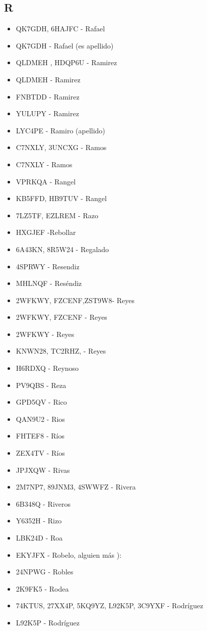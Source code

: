 \subsection*{R}
\begin{itemize}[leftmargin=*,nosep]
\item QK7GDH, 6HAJFC - Rafael
\item QK7GDH - Rafael (es apellido)
\item QLDMEH , HDQP6U - Ramirez
\item QLDMEH - Ramirez
\item FNBTDD - Ramirez
\item YULUPY - Ramirez
\item LYC4PE - Ramiro (apellido)
\item C7NXLY, 3UNCXG - Ramos
\item C7NXLY  -  Ramos
\item VPRKQA -  Rangel
\item KB5FFD, HB9TUV - Rangel
\item 7LZ5TF, EZLREM - Razo
\item HXGJEF -Rebollar
\item 6A43KN, 8R5W24 - Regalado
\item 4SPRWY - Resendiz
\item MHLNQF - Reséndiz
\item 2WFKWY, FZCENF,ZST9W8- Reyes
\item 2WFKWY, FZCENF - Reyes
\item 2WFKWY  -  Reyes
\item KNWN28, TC2RHZ, - Reyes
\item H6RDXQ - Reynoso
\item PV9QBS - Reza
\item GPD5QV - Rico
\item QAN9U2 - Rios
\item FHTEF8 - Ríos
\item ZEX4TV  -  Ríos
\item JPJXQW - Rivas
\item 2M7NP7, 89JNM3, 4SWWFZ -  Rivera
\item 6B348Q - Riveros
\item Y6352H - Rizo
\item LBK24D - Roa
\item EKYJFX - Robelo, alguien más ):
\item 24NPWG - Robles
\item 2K9FK5 - Rodea
\item 74KTUS, 27XX4P, 5KQ9YZ, L92K5P, 3C9YXF - Rodríguez
\item L92K5P - Rodríguez

\end{itemize}
